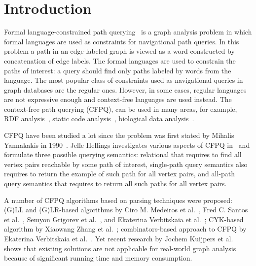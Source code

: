 \section{Introduction}

Formal language-constrained path querying~\cite{doi:10.1137/S0097539798337716} is a graph analysis problem in which formal languages are used as constraints for
navigational path queries. In this problem a path in an edge-labeled graph is viewed
as a word constructed by concatenation of edge labels. The formal languages are used to constrain the paths of interest: a query should find only paths labeled by words from the language. The most popular class of constraints used as navigational queries in graph databases are the regular ones.
However, in some cases, regular languages are not expressive enough and context-free languages are used instead. The context-free path querying (CFPQ), can be used in many areas, for example, RDF analysis~\cite{10.1007/978-3-319-46523-4_38}, static code analysis~\cite{Zheng,10.1145/373243.360208}, biological data analysis~\cite{SubgraphQueriesbyContextfreeGrammars}.

CFPQ have been studied a lot since the problem was first stated by Mihalis Yannakakis in 1990~\cite{Yannakakis}.
Jelle Hellings investigates various aspects of CFPQ in~\cite{hellingsPathQuerying,hellingsRelational,DBLP:journals/corr/Hellings15} and formulate three possible querying semantics: relational that requires to find all vertex pairs reachable by some path of interest, single-path query semantics also requires to return the example of such path for all vertex pairs, and all-path query semantics that requires to return all such paths for all vertex pairs.

A number of CFPQ algorithms based on parsing techniques were proposed: (G)LL and (G)LR-based algorithms by Ciro M. Medeiros et al.~\cite{Medeiros:2018:EEC:3167132.3167265}, Fred C. Santos et al.~\cite{10.1007/978-3-319-91662-0_17}, Semyon Grigorev et al.~\cite{Grigorev:2017:CPQ:3166094.3166104}, and Ekaterina Verbitskaia et al.~\cite{10.1007/978-3-319-41579-6_22}; CYK-based algorithm by Xiaowang Zhang et al.~\cite{10.1007/978-3-319-46523-4_38}; combinators-based approach to CFPQ by Ekaterina Verbitskaia et al.~\cite{Verbitskaia:2018:PCC:3241653.3241655}.
Yet recent research by Jochem Kuijpers et al.~\cite{Kuijpers:2019:ESC:3335783.3335791} shows that existing solutions are not applicable for real-world graph analysis because of significant
running time and memory consumption.

